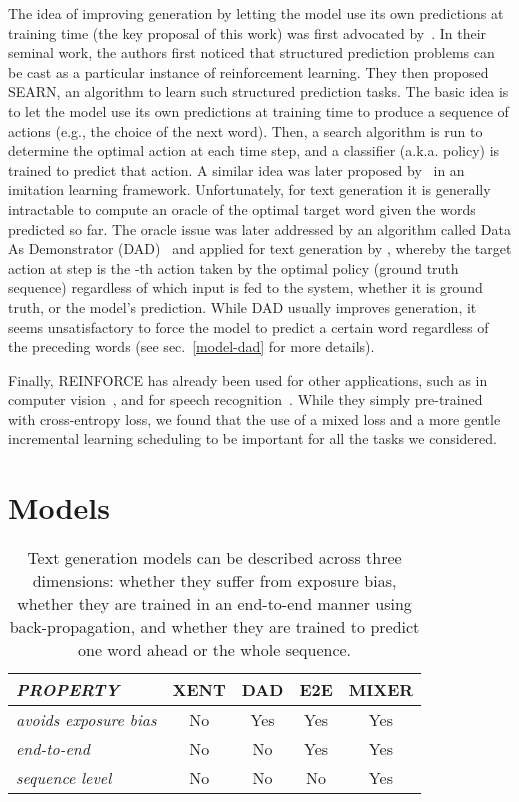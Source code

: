 \documentclass{article} \usepackage{iclr2016_conference,times}
\makeatletter
\newcommand*{\aka}{a.k.a.\@\xspace}
\makeatother
\begin{document}
The idea of improving generation by letting the model use its own predictions at training 
time (the key proposal of this work) was first advocated by~\citet{searn}. In their seminal 
work, the authors first noticed that structured prediction problems
can be cast as a particular instance of reinforcement learning. They then
proposed SEARN, an algorithm to learn such structured
prediction tasks. The basic idea is to let the model use its own
predictions at training time to produce a sequence of actions (e.g.,
the choice of the next word). Then, a search algorithm is
run to determine the optimal action at each time step, and a
classifier (\aka policy) is trained to predict that action. A similar idea was later
proposed by~\citet{dagger} in an imitation learning framework. 
Unfortunately, for text generation it is generally intractable to compute
an oracle of the optimal target word given the words predicted so far.
The oracle issue was later addressed by an algorithm called 
Data As Demonstrator (DAD)~\citep{dad} and applied for text generation by 
\cite{sbengio-nips2015}, whereby the target action at step  is the
-th action taken by the optimal policy (ground truth sequence) regardless of which
input is fed to the system, whether it is ground truth, or the model's
prediction. While DAD usually improves generation, it seems unsatisfactory to force 
the model to predict a certain word regardless of the preceding words 
(see sec.~\ref{model-dad} for more details). 

Finally, REINFORCE has already been used for other applications, such as in 
computer vision~\citep{vmnih-nips2014,xu-icml2015,ba_iclr15}, and for speech recognition~\cite{graves_icml14}. 
While they simply pre-trained with cross-entropy loss, we found that the use of a mixed loss and a more gentle incremental learning scheduling to be important for all the tasks we considered. \section{Models} \label{model}
\begin{table}[t]
	\footnotesize
    \caption{Text generation models can be described across three dimensions: whether they suffer from exposure bias, 
whether they are trained in an end-to-end manner using back-propagation, 
and whether they are trained to predict one word ahead or the whole sequence.}
    \begin{tabular}{l || c | c | c |c}
      \multicolumn{1}{l||}{\em PROPERTY}  & 
      \multicolumn{1}{l|}{XENT} &
      \multicolumn{1}{l|}{DAD} & \multicolumn{1}{c|}{E2E} & \multicolumn{1}{c}{MIXER}\\
      \hline
      \hline
      {\em avoids exposure bias} & No & Yes & Yes & Yes \\
      \hline
      {\em end-to-end} & No & No & Yes & Yes \\
      \hline
      {\em sequence level} & No & No & No & Yes \\
    \end{tabular}
\label{tab:model_comparison}
\end{table}
\end{document}
